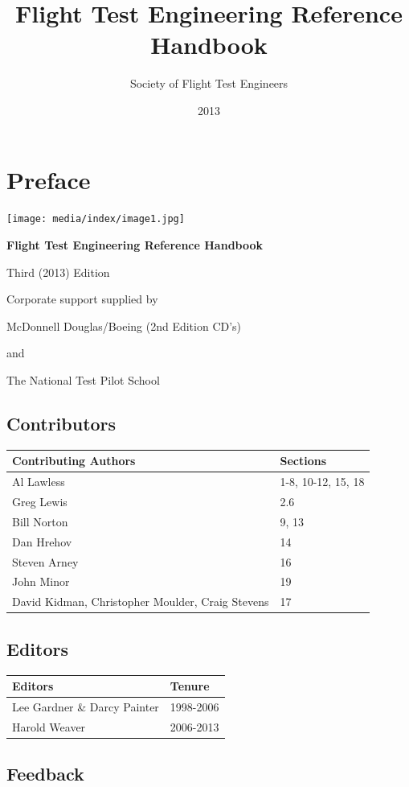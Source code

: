 \documentclass[
]{book}
\title{Flight Test Engineering Reference Handbook}
\author{Society of Flight Test Engineers}
\date{2013}
\begin{document}
\maketitle

{
\setcounter{tocdepth}{1}
\tableofcontents
}
\hypertarget{preface}{%
\chapter*{Preface}\label{preface}}

\texttt{[image: media/index/image1.jpg]}

\textbf{Flight Test Engineering Reference Handbook}

Third (2013) Edition

Corporate support supplied by

McDonnell Douglas/Boeing (2nd Edition CD's)

and

The National Test Pilot School

\hypertarget{contributors}{%
\section*{Contributors}\label{contributors}}

\begin{longtable}[]{@{}ll@{}}
\toprule
Contributing Authors & Sections\tabularnewline
\midrule
\endhead
Al Lawless & 1-8, 10-12, 15, 18\tabularnewline
Greg Lewis & 2.6\tabularnewline
Bill Norton & 9, 13\tabularnewline
Dan Hrehov & 14\tabularnewline
Steven Arney & 16\tabularnewline
John Minor & 19\tabularnewline
David Kidman, Christopher Moulder, Craig Stevens & 17\tabularnewline
\bottomrule
\end{longtable}

\hypertarget{editors}{%
\section*{Editors}\label{editors}}

\begin{longtable}[]{@{}ll@{}}
\toprule
Editors & Tenure\tabularnewline
\midrule
\endhead
Lee Gardner \& Darcy Painter & 1998-2006\tabularnewline
Harold Weaver & 2006-2013\tabularnewline
\bottomrule
\end{longtable}

\hypertarget{feedback}{%
\section*{Feedback}\label{feedback}}
\end{document}
